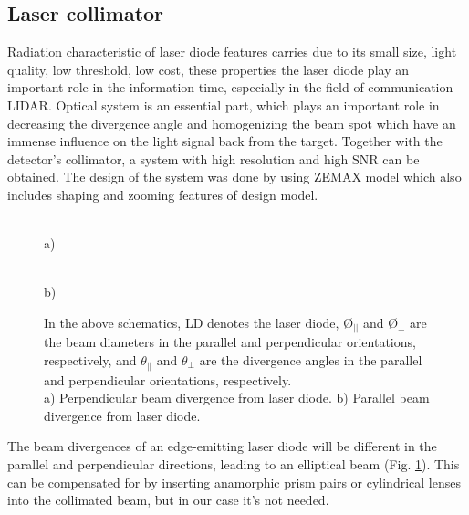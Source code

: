 \subsection{Laser collimator}

Radiation characteristic of laser diode features carries due to its small size, light
quality, low threshold, low cost, these properties the laser diode play an important role in the information time, especially in the field of communication LIDAR.
Optical system is an essential part, which plays an important role in decreasing the divergence angle and homogenizing the beam spot which have an immense
influence on the light signal back from the target.
Together with the detector's collimator, a system with high resolution and high SNR can be obtained.
The design of the system was done by using ZEMAX model which also includes shaping and zooming features of design model.

\begin{figure}[H]
\begin{minipage}[h]{0.52\linewidth}
 \\ a) 
\end{minipage}
\hfill
\begin{minipage}[h]{0.45\linewidth}
 \\ b)
\end{minipage}
\caption{
In the above schematics, LD denotes the laser diode, \O$_{||}$ and \O$_{\perp}$ are the beam diameters in the parallel and perpendicular orientations, respectively, and $\theta_{||}$
 and  $\theta_{\perp}$ are the divergence angles in the parallel and perpendicular orientations, respectively.\\
a) Perpendicular beam divergence from laser diode.
b) Parallel beam divergence from laser diode.
}
\label{fig:laser_beam}
\end{figure}

The beam divergences of an edge-emitting laser diode will be different in the parallel and perpendicular directions, leading to an elliptical beam (Fig. \ref{fig:laser_beam}).
This can be compensated for by inserting anamorphic prism pairs or cylindrical lenses into the collimated beam, but in our case it's not needed.

